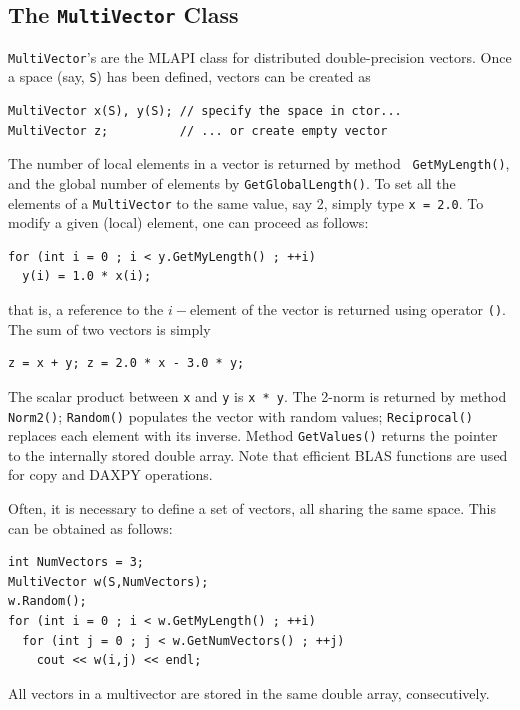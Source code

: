 \documentclass{article}[11pt]
\newcommand{\MLAPI}  {{\sc MLAPI }}
\begin{document}
\subsection{The {\tt MultiVector} Class}
\label{sec:multivector}

{\tt MultiVector}'s are the \MLAPI class for distributed double-precision
vectors. Once a space (say, {\tt S}) has been defined, vectors can be created
as
\begin{verbatim}
MultiVector x(S), y(S); // specify the space in ctor...
MultiVector z;          // ... or create empty vector
\end{verbatim}

The number of local elements in a vector is returned by method {\tt
  GetMyLength()}, and the global number of elements by
{\tt GetGlobalLength()}. To set all the elements of a {\tt MultiVector} to the same value, say 2, simply type {\tt x = 2.0}. To modify a given (local) element, one can proceed as follows:
\begin{verbatim}
for (int i = 0 ; i < y.GetMyLength() ; ++i)
  y(i) = 1.0 * x(i);
\end{verbatim}
that is, a reference to the $i-$element of the vector is returned using
operator \verb!()!.  The sum of two vectors is simply
\begin{verbatim}
z = x + y; z = 2.0 * x - 3.0 * y; 
\end{verbatim}
The scalar product between {\tt x} and {\tt y} is {\tt x * y}. The 2-norm is
returned by method {\tt Norm2()}; {\tt Random()} populates the vector with
random values; {\tt Reciprocal()} replaces each element with its inverse. 
Method {\tt GetValues()} returns the pointer to the internally stored double
array. Note
that efficient BLAS functions are used for copy and DAXPY operations. 

\smallskip

Often, it is necessary to define a set of vectors, all sharing the same space.
This can be obtained as follows:
\begin{verbatim}
int NumVectors = 3;
MultiVector w(S,NumVectors);
w.Random();
for (int i = 0 ; i < w.GetMyLength() ; ++i)
  for (int j = 0 ; j < w.GetNumVectors() ; ++j)
    cout << w(i,j) << endl;
\end{verbatim}
All vectors in a multivector are stored in the same double array,
  consecutively.
\end{document}
